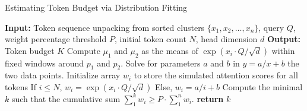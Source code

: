 \begin{algorithm}[h]
\caption{Estimating Token Budget via Distribution Fitting}
\label{alg:token_selection}
\begin{algorithmic}[1]
\STATE \textbf{Input:} Token sequence unpacking from sorted clusters $\{x_1, x_2, \dots, x_n\}$, query $Q$, weight percentage threshold $P$, initial token count $N$, head dimension $d$
\STATE \textbf{Output:} Token budget $K$
\STATE
\STATE Compute $\mu_1$ and $\mu_2$ as the means of $\exp(x_i \cdot Q/ \sqrt{d})$ within fixed windows around $p_1$ and $p_2$. Solve for parameters $a$ and $b$ in $y = a/x + b$ the two data points.
\STATE
\STATE Initialize array $w_i$ to store the simulated attention scores for all tokens
    \STATE \quad If $i \leq N$, $w_i = \exp(x_i \cdot Q/ \sqrt{d})$
    \STATE \quad Else, $w_i = a/i + b$
\ENDFOR
\STATE Compute the minimal $k$ such that the cumulative sum $\sum_{1}^k w_i \geq P \cdot \sum^{n}_{1}{w_i}$.
\STATE
\STATE \textbf{return} $k$
\end{algorithmic}
\end{algorithm}
